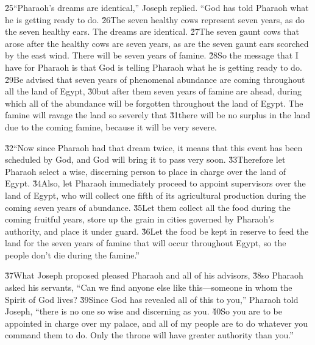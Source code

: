 \v{25}``Pharaoh's dreams are identical,'' Joseph replied. ``God has told Pharaoh what he is getting ready to do. \v{26}The seven healthy cows represent seven years, as do the seven healthy ears. The dreams are identical. \v{27}The seven gaunt cows that arose after the healthy cows are seven years, as are the seven gaunt ears scorched by the east wind. There will be seven years of famine. \v{28}So the message that I have for Pharaoh is that God is telling Pharaoh what he is getting ready to do. \v{29}Be advised that seven years of phenomenal abundance are coming throughout all the land of Egypt, \v{30}but after them seven years of famine are ahead, during which all of the abundance will be forgotten throughout the land of Egypt. The famine will ravage the land so severely that \v{31}there will be no surplus in the land due to the coming famine, because it will be very severe.

\v{32}``Now since Pharaoh had that dream twice, it means that this event has been scheduled by God, and God will bring it to pass very soon. \v{33}Therefore let Pharaoh select a wise, discerning person to place in charge over the land of Egypt. \v{34}Also, let Pharaoh immediately proceed to appoint supervisors over the land of Egypt, who will collect one fifth of its agricultural production during the coming seven years of abundance. \v{35}Let them collect all the food during the coming fruitful years, store up the grain in cities governed by Pharaoh's authority, and place it under guard. \v{36}Let the food be kept in reserve to feed the land for the seven years of famine that will occur throughout Egypt, so the people don't die during the famine.''

\v{37}What Joseph proposed pleased Pharaoh and all of his advisors, \v{38}so Pharaoh asked his servants, ``Can we find anyone else like this---someone in whom the Spirit of God lives? \v{39}Since God has revealed all of this to you,'' Pharaoh told Joseph, ``there is no one so wise and discerning as you. \v{40}So you are to be appointed in charge over my palace, and all of my people are to do whatever you command them to do. Only the throne will have greater authority than you.''

